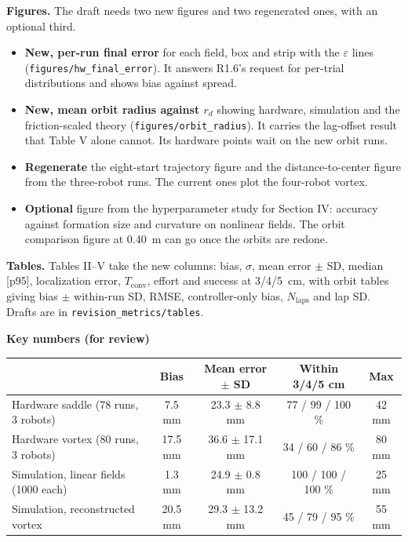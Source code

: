 \documentclass[10pt]{article}
\begin{document}
\medskip
\textbf{Figures.} The draft needs two new figures and two regenerated ones, with an optional third.
\begin{itemize}
\item \textbf{New, per-run final error} for each field, box and strip with the $\varepsilon$ lines (\texttt{figures/hw\_final\_error}). It answers R1.6's request for per-trial distributions and shows bias against spread.
\item \textbf{New, mean orbit radius against $r_d$} showing hardware, simulation and the friction-scaled theory (\texttt{figures/orbit\_radius}). It carries the lag-offset result that Table V alone cannot. Its hardware points wait on the new orbit runs.
\item \textbf{Regenerate} the eight-start trajectory figure and the distance-to-center figure from the three-robot runs. The current ones plot the four-robot vortex.
\item \textbf{Optional} figure from the hyperparameter study for Section IV: accuracy against formation size and curvature on nonlinear fields. The orbit comparison figure at 0.40~m can go once the orbits are redone.
\end{itemize}

\textbf{Tables.} Tables II--V take the new columns: bias, $\sigma$, mean error $\pm$ SD, median [p95], localization error, $T_{\mathrm{conv}}$, effort and success at 3/4/5~cm, with orbit tables giving bias $\pm$ within-run SD, RMSE, controller-only bias, $N_{\mathrm{laps}}$ and lap SD. Drafts are in \texttt{revision\_metrics/tables}.

\medskip
\textbf{Key numbers (for review)}

\small
\begin{tabular}{lcccc}
\toprule
 & \textbf{Bias} & \textbf{Mean error $\pm$ SD} & \textbf{Within 3/4/5 cm} & \textbf{Max} \\
\midrule
Hardware saddle (78 runs, 3 robots) & 7.5 mm & 23.3 $\pm$ 8.8 mm & 77 / 99 / 100 \% & 42 mm \\
Hardware vortex (80 runs, 3 robots) & 17.5 mm & 36.6 $\pm$ 17.1 mm & 34 / 60 / 86 \% & 80 mm \\
Simulation, linear fields (1000 each) & 1.3 mm & 24.9 $\pm$ 0.8 mm & 100 / 100 / 100 \% & 25 mm \\
Simulation, reconstructed vortex & 20.5 mm & 29.3 $\pm$ 13.2 mm & 45 / 79 / 95 \% & 55 mm \\
\bottomrule
\end{tabular}
\normalsize
\end{document}
